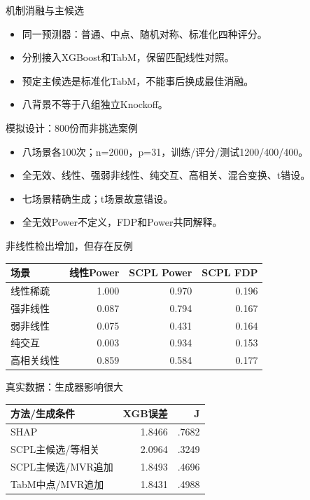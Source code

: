 \documentclass[aspectratio=169]{beamer}
\begin{document}
\begin{frame}{机制消融与主候选}
\begin{itemize}
\item 同一预测器：普通、中点、随机对称、标准化四种评分。
\item 分别接入XGBoost和TabM，保留匹配线性对照。
\item 预定主候选是标准化TabM，不能事后换成最佳消融。
\item 八背景不等于八组独立Knockoff。
\end{itemize}
\end{frame}
\begin{frame}{模拟设计：800份而非挑选案例}
\begin{itemize}
\item 八场景各100次；n=2000，p=31，训练/评分/测试1200/400/400。
\item 全无效、线性、强弱非线性、纯交互、高相关、混合变换、t错设。
\item 七场景精确生成；t场景故意错设。
\item 全无效Power不定义，FDP和Power共同解释。
\end{itemize}
\end{frame}
\begin{frame}{非线性检出增加，但存在反例}
\footnotesize\centering \begin{tabular}{lrrr}
\toprule
场景 & 线性Power & SCPL Power & SCPL FDP\\\midrule
线性稀疏 & 1.000 & 0.970 & 0.196\\
强非线性 & 0.087 & 0.794 & 0.167\\
弱非线性 & 0.075 & 0.431 & 0.164\\
纯交互 & 0.003 & 0.934 & 0.153\\
高相关线性 & 0.859 & 0.584 & 0.177\\
\bottomrule
\end{tabular}
\end{frame}
\begin{frame}{真实数据：生成器影响很大}
\footnotesize\centering \begin{tabular}{lrr}
\toprule
方法/生成条件 & XGB误差 & J\\\midrule
SHAP & 1.8466 & .7682\\
SCPL主候选/等相关 & 2.0964 & .3249\\
SCPL主候选/MVR追加 & 1.8493 & .4696\\
TabM中点/MVR追加 & 1.8431 & .4988\\
\bottomrule
\end{tabular}
\end{frame}
\end{document}
